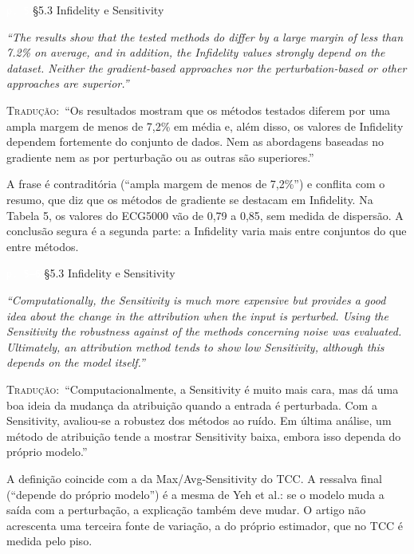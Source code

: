 \documentclass[11pt,a4paper]{article}
\newcommand{\pagechip}[1]{{\setlength{\fboxsep}{1.5pt}\colorbox{cAcc}{\textcolor{white}{\scriptsize\texttt{#1}}}}}
\newenvironment{origquote}{\par\itshape\small}{\par}
\newenvironment{tradquote}{\par\small\textsc{Tradução:}\ }{\par}
\newcommand{\explab}[1]{\par\smallskip{\small\color{cAcc}\textbf{\MakeUppercase{#1}}}\par}
\begin{document}
\begin{citacard}{\pagechip{p. 5} §5.3 Infidelity e Sensitivity}
\begin{origquote}“The results show that the tested methods do differ by a large margin of less than 7.2\% on average, and in addition, the Infidelity values strongly depend on the dataset. Neither the gradient-based approaches nor the perturbation-based or other approaches are superior.”\end{origquote}
\begin{tradquote}“Os resultados mostram que os métodos testados diferem por uma ampla margem de menos de 7,2\% em média e, além disso, os valores de Infidelity dependem fortemente do conjunto de dados. Nem as abordagens baseadas no gradiente nem as por perturbação ou as outras são superiores.”\end{tradquote}
\explab{Explicação}
A frase é contraditória (``ampla margem de menos de 7,2\%'') e conflita com o resumo, que diz que os métodos de gradiente se destacam em Infidelity. Na Tabela 5, os valores do ECG5000 vão de 0,79 a 0,85, sem medida de dispersão. A conclusão segura é a segunda parte: a Infidelity varia mais entre conjuntos do que entre métodos.
\end{citacard}

\begin{citacard}{\pagechip{p. 5--6} §5.3 Infidelity e Sensitivity}
\begin{origquote}“Computationally, the Sensitivity is much more expensive but provides a good idea about the change in the attribution when the input is perturbed. Using the Sensitivity the robustness against of the methods concerning noise was evaluated. Ultimately, an attribution method tends to show low Sensitivity, although this depends on the model itself.”\end{origquote}
\begin{tradquote}“Computacionalmente, a Sensitivity é muito mais cara, mas dá uma boa ideia da mudança da atribuição quando a entrada é perturbada. Com a Sensitivity, avaliou-se a robustez dos métodos ao ruído. Em última análise, um método de atribuição tende a mostrar Sensitivity baixa, embora isso dependa do próprio modelo.”\end{tradquote}
\explab{Explicação}
A definição coincide com a da Max/Avg-Sensitivity do TCC. A ressalva final (``depende do próprio modelo'') é a mesma de Yeh et al.: se o modelo muda a saída com a perturbação, a explicação também deve mudar. O artigo não acrescenta uma terceira fonte de variação, a do próprio estimador, que no TCC é medida pelo piso.
\end{citacard}
\end{document}
